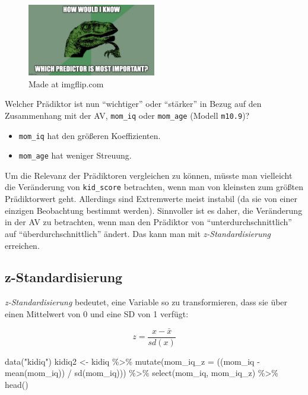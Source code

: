 \documentclass[
  a4paper,
  DIV=11]{scrreprt}
\newenvironment{Shaded}{\begin{snugshade}}{\end{snugshade}}
\newcommand{\AttributeTok}[1]{\textcolor[rgb]{0.40,0.45,0.13}{#1}}
\newcommand{\FunctionTok}[1]{\textcolor[rgb]{0.28,0.35,0.67}{#1}}
\newcommand{\NormalTok}[1]{\textcolor[rgb]{0.00,0.23,0.31}{#1}}
\newcommand{\OtherTok}[1]{\textcolor[rgb]{0.00,0.23,0.31}{#1}}
\newcommand{\SpecialCharTok}[1]{\textcolor[rgb]{0.37,0.37,0.37}{#1}}
\newcommand{\StringTok}[1]{\textcolor[rgb]{0.13,0.47,0.30}{#1}}
\providecommand{\tightlist}{%
  \setlength{\itemsep}{0pt}\setlength{\parskip}{0pt}}\usepackage{longtable,booktabs,array}
\theoremstyle{definition}
\theoremstyle{remark}
\begin{document}
\begin{figure}

{\centering \includegraphics[width=0.5\textwidth,height=\textheight]{./img/5sps62.jpg}

}

\caption{\label{fig-how-would-i-know}Made at imgflip.com}

\end{figure}

Welcher Prädiktor ist nun ``wichtiger'' oder ``stärker'' in Bezug auf
den Zusammenhang mit der AV, \texttt{mom\_iq} oder \texttt{mom\_age}
(Modell \texttt{m10.9})?

\begin{itemize}
\tightlist
\item
  \texttt{mom\_iq} hat den größeren Koeffizienten.
\item
  \texttt{mom\_age} hat weniger Streuung.
\end{itemize}

Um die Relevanz der Prädiktoren vergleichen zu können, müsste man
vielleicht die Veränderung von \texttt{kid\_score} betrachten, wenn man
von kleinsten zum größten Prädiktorwert geht. Allerdings sind
Extremwerte meist instabil (da sie von einer einzigen Beobachtung
bestimmt werden). Sinnvoller ist es daher, die Veränderung in der AV zu
betrachten, wenn man den Prädiktor von ``unterdurchschnittlich'' auf
``überdurchschnittlich'' ändert. Das kann man mit
\emph{z-Standardisierung} erreichen.

\hypertarget{z-standardisierung}{%
\subsection{z-Standardisierung}\label{z-standardisierung}}

\emph{z-Standardisierung} bedeutet, eine Variable so zu transformieren,
dass sie über einen Mittelwert von 0 und eine SD von 1 verfügt:

\[z = \frac{x - \bar{x}}{sd(x)}\]

\begin{Shaded}
\begin{Highlighting}[]
\FunctionTok{data}\NormalTok{(}\StringTok{"kidiq"}\NormalTok{)}
\NormalTok{kidiq2 }\OtherTok{\textless{}{-}} 
\NormalTok{  kidiq }\SpecialCharTok{\%\textgreater{}\%} 
  \FunctionTok{mutate}\NormalTok{(}\AttributeTok{mom\_iq\_z =}\NormalTok{ ((mom\_iq }\SpecialCharTok{{-}} \FunctionTok{mean}\NormalTok{(mom\_iq)) }\SpecialCharTok{/} \FunctionTok{sd}\NormalTok{(mom\_iq)))  }\SpecialCharTok{\%\textgreater{}\%} 
  \FunctionTok{select}\NormalTok{(mom\_iq, mom\_iq\_z) }\SpecialCharTok{\%\textgreater{}\%} 
  \FunctionTok{head}\NormalTok{()}
\end{Highlighting}
\end{Shaded}
\end{document}
